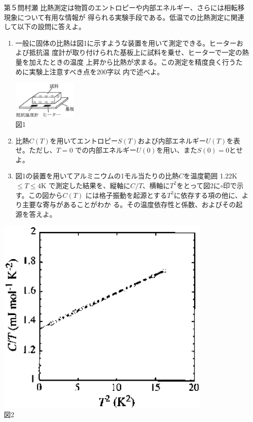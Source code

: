 \begin{question}{第５問}{村瀬}
比熱測定は物質のエントロピーや内部エネルギー、さらには相転移現象について有用な情報が
得られる実験手段である。低温での比熱測定に関連して以下の設問に答えよ。
\begin{enumerate}
\item
  一般に固体の比熱は図1に示すような装置を用いて測定できる。ヒーターおよび抵抗温
  度計が取り付けられた基板上に試料を乗せ、ヒーターで一定の熱量を加えたときの温度
  上昇から比熱が求まる。この測定を精度良く行うために実験上注意すべき点を200字以
  内で述べよ。
  \begin{center}
    \includegraphics[width=0.25\textwidth]{2006physQ5_1r.eps}\\図1
  \end{center}
\item
  比熱$C(T)$を用いてエントロピー$S(T)$および内部エネルギー$U(T)$を表せ。ただし、$T=0$
  での内部エネルギー$U(0)$を用い、また$S(0)=0$とせよ。
\item
  図1の装置を用いてアルミニウムの1モル当たりの比熱$C$を温度範囲 1.22K$\le T \le4$K
  で測定した結果を、縦軸に$C/T$、横軸に$T^2$をとって図2に$\circ$印で示す。この図から$C(T)$
  には格子振動を起源とする$T^3$に依存する項の他に、より主要な寄与があることがわか
  る。その温度依存性と係数、およびその起源を答えよ。
\end{enumerate}
\begin{center}
  \begin{minipage}[t]{0.45\textwidth}
    \begin{center}
      \includegraphics[width=0.8\textwidth]{2006physQ5_2r.eps}\\図2

\end{center}
\end{minipage}
\end{center}
\end{question}
